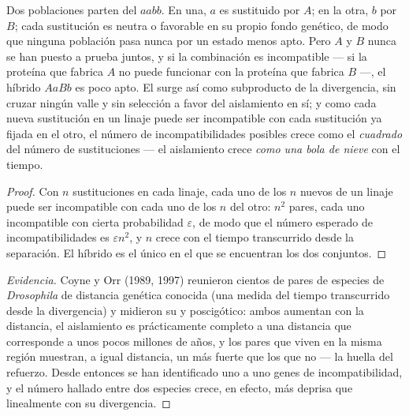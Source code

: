 \begin{theorem}\label{thm:b2:speciation:dm}
Dos poblaciones parten del  $aabb$. En una, $a$ es sustituido
por $A$; en la otra, $b$ por $B$; cada sustitución es neutra o favorable
en su propio fondo genético, de modo que ninguna población pasa nunca por
un estado menos apto. Pero $A$ y $B$ nunca se han puesto a prueba juntos,
y si la combinación es incompatible --- si la proteína que fabrica $A$ no
puede funcionar con la proteína que fabrica $B$ ---, el híbrido $AaBb$ es
poco apto. El  surge así como subproducto de la
divergencia, sin cruzar ningún valle y sin selección a favor del
aislamiento en sí; y como cada nueva sustitución en un linaje puede ser
incompatible con cada sustitución ya fijada en el otro, el número de
incompatibilidades posibles crece como el
\emph{cuadrado} del número de sustituciones --- el aislamiento crece
\emph{como una bola de nieve} con el tiempo.
\end{theorem}
\begin{proof}
Con $n$ sustituciones en cada linaje, cada uno de los $n$  nuevos de
un linaje puede ser incompatible con cada uno de los $n$ del otro:
$n^{2}$ pares, cada uno incompatible con cierta probabilidad
$\varepsilon$, de modo que el número esperado de incompatibilidades es
$\varepsilon n^{2}$, y $n$ crece con el tiempo transcurrido desde la
separación. El híbrido es el único  en el que se encuentran los
dos conjuntos.
\end{proof}
\begin{proof}[Evidencia]
Coyne y Orr (1989, 1997) reunieron cientos de pares de especies de
\emph{Drosophila} de distancia genética conocida (una medida del tiempo
transcurrido desde la divergencia) y midieron su  y
poscigótico: ambos aumentan con la distancia, el aislamiento es
prácticamente completo a una distancia que corresponde a unos pocos
millones de años, y los pares que viven en la misma región muestran, a
igual distancia, un  más fuerte que los que no ---
la huella del refuerzo. Desde entonces se han identificado uno a uno genes
de incompatibilidad, y el número hallado entre dos especies crece, en
efecto, más deprisa que linealmente con su divergencia.
\end{proof}
